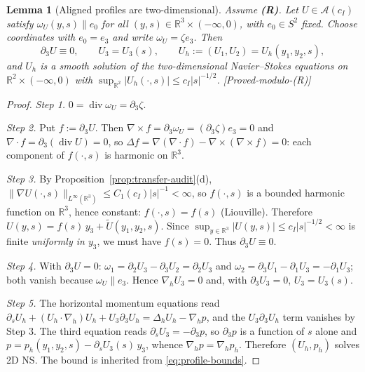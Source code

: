 \documentclass[11pt]{article}
\newtheorem{lemma}[theorem]{Lemma}
\theoremstyle{definition}
\theoremstyle{remark}
\newcommand{\R}{\mathbb{R}}
\begin{document}
\begin{lemma}[Aligned profiles are two-dimensional]\label{lem:harmonic-reduction}
  Assume \textbf{(R)}. Let $U\in\mathcal{A}(c_I)$ satisfy
  $\omega_U(y,s)\parallel e_0$ for all $(y,s)\in\R^3\times(-\infty,0)$, with
  $e_0\in S^2$ fixed. Choose coordinates with $e_0=e_3$ and write
  $\omega_U=\zeta e_3$. Then
  \[
    \partial_3 U \equiv 0,
    \qquad U_3 = U_3(s),
    \qquad U_h := (U_1,U_2) = U_h(y_1,y_2,s),
  \]
  and $U_h$ is a smooth solution of the two-dimensional Navier--Stokes
  equations on $\R^2\times(-\infty,0)$ with
  $\sup_{\R^2}|U_h(\cdot,s)|\leq c_I|s|^{-1/2}$.
  \emph{[Proved-modulo-(R)]}
\end{lemma}
\begin{proof}
  \emph{Step 1.} $0=\operatorname{div}\omega_U=\partial_3\zeta$.

  \emph{Step 2.} Put $f:=\partial_3 U$. Then
  $\nabla\times f=\partial_3\omega_U=(\partial_3\zeta)e_3=0$ and
  $\nabla\cdot f=\partial_3(\operatorname{div}U)=0$, so
  $\Delta f=\nabla(\nabla\cdot f)-\nabla\times(\nabla\times f)=0$: each
  component of $f(\cdot,s)$ is harmonic on $\R^3$.

  \emph{Step 3.} By Proposition~\ref{prop:transfer-audit}(d),
  $\|\nabla U(\cdot,s)\|_{L^\infty(\R^3)}\leq C_1(c_I)|s|^{-1}<\infty$, so
  $f(\cdot,s)$ is a bounded harmonic function on $\R^3$, hence constant:
  $f(\cdot,s)=f(s)$ (Liouville). Therefore
  $U(y,s)=f(s)\,y_3+\tilde U(y_1,y_2,s)$. Since
  $\sup_{y\in\R^3}|U(y,s)|\leq c_I|s|^{-1/2}<\infty$ is finite \emph{uniformly
  in $y_3$}, we must have $f(s)=0$. Thus $\partial_3U\equiv0$.

  \emph{Step 4.} With $\partial_3U=0$:
  $\omega_1=\partial_2U_3-\partial_3U_2=\partial_2U_3$ and
  $\omega_2=\partial_3U_1-\partial_1U_3=-\partial_1U_3$; both vanish because
  $\omega_U\parallel e_3$. Hence $\nabla_hU_3=0$ and, with
  $\partial_3U_3=0$, $U_3=U_3(s)$.

  \emph{Step 5.} The horizontal momentum equations read
  $\partial_sU_h+(U_h\!\cdot\!\nabla_h)U_h+U_3\partial_3U_h
  =\Delta_hU_h-\nabla_hp$, and the $U_3\partial_3U_h$ term vanishes by
  Step 3. The third equation reads $\partial_sU_3=-\partial_3p$, so
  $\partial_3p$ is a function of $s$ alone and
  $p=p_h(y_1,y_2,s)-\partial_sU_3(s)\,y_3$, whence $\nabla_hp=\nabla_hp_h$.
  Therefore $(U_h,p_h)$ solves 2D NS. The bound is inherited from
  \eqref{eq:profile-bounds}.
\end{proof}
\end{document}
